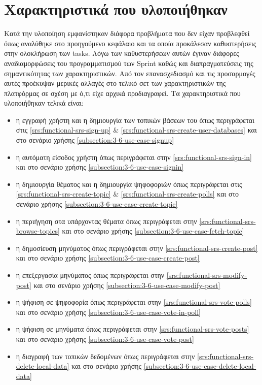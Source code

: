 \section{Χαρακτηριστικά που υλοποιήθηκαν} \label{section:4-5-implemented-parts}

Κατά την υλοποίηση εμφανίστηκαν διάφορα προβλήματα που δεν είχαν προβλεφθεί όπως αναλύθηκε στο προηγούμενο κεφάλαιο και τα οποία προκάλεσαν καθυστερήσεις στην ολοκλήρωση των tasks. Λόγω των καθυστερήσεων αυτών έγιναν διάφορες αναδιαμορφώσεις του προγραμματισμού των Sprint καθώς και διαπραγματεύσεις της σημαντικότητας των χαρακτηριστικών. Από τον επανασχεδιασμό και τις προσαρμογές αυτές προέκυψαν μερικές αλλαγές στο τελικό σετ των χαρακτηριστικών της πλατφόρμας σε σχέση με ό,τι είχε αρχικά προδιαγραφεί. Τα χαρακτηριστικά που υλοποιήθηκαν τελικά είναι:

\begin{itemize}
    \item η εγγραφή χρήστη και η δημιουργία των τοπικών βάσεων του όπως περιγράφεται στις \ref{srs:functional-srs-sign-up} \& \ref{srs:functional-srs-create-user-databases} και στο σενάριο χρήσης \ref{subsection:3-6-use-case-signup}
    \item η αυτόματη είσοδος χρήστη όπως περιγράφεται στην \ref{srs:functional-srs-sign-in} και στο σενάριο χρήσης \ref{subsection:3-6-use-case-signin}
    \item η δημιουργία θέματος και η δημιουργία ψηφοφοριών όπως περιγράφεται στις \ref{srs:functional-srs-create-topic} \& \ref{srs:functional-srs-create-polls} και στο σενάριο χρήσης \ref{subsection:3-6-use-case-create-topic}
    \item η περιήγηση στα υπάρχοντας θέματα όπως περιγράφεται στην \ref{srs:functional-srs-browse-topics} και στο σενάριο χρήσης \ref{subsection:3-6-use-case-fetch-topic}
    \item η δημοσίευση μηνύματος όπως περιγράφεται στην \ref{srs:functional-srs-create-post} και στο σενάριο χρήσης \ref{subsection:3-6-use-case-create-post}
    \item η επεξεργασία μηνύματος όπως περιγράφεται στην \ref{srs:functional-srs-modify-post} και στο σενάριο χρήσης \ref{subsection:3-6-use-case-modify-post}
    \item η ψήφιση σε ψηφοφορία όπως περιγράφεται στην \ref{srs:functional-srs-vote-polls} και στο σενάριο χρήσης \ref{subsection:3-6-use-case-vote-in-poll}
    \item η ψήφιση σε μηνύματα όπως περιγράφεται στην \ref{srs:functional-srs-vote-posts} και στο σενάριο χρήσης \ref{subsection:3-6-use-case-vote-post}
    \item η διαγραφή των τοπικών δεδομένων όπως περιγράφεται στην \ref{srs:functional-srs-delete-local-data} και στο σενάριο χρήσης \ref{subsection:3-6-use-case-delete-local-data}
\end{itemize}

